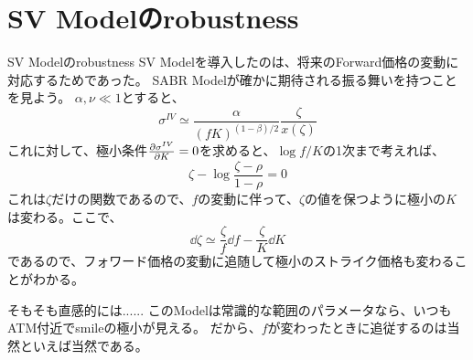 \documentclass[dvipdfmx,9pt]{beamer}
\begin{document}
\section{SV Modelのrobustness}
\begin{frame}{SV Modelのrobustness}
  SV Modelを導入したのは、将来のForward価格の変動に対応するためであった。
  SABR Modelが確かに期待される振る舞いを持つことを見よう。
  $\alpha,\nu \ll 1$とすると、
  \begin{equation}
    \sigma^{IV} \simeq \frac{\alpha}{(fK)^{(1-\beta)/2}}\frac{\zeta}{x(\zeta)}
  \end{equation}
  これに対して、極小条件$\pdv{\sigma^{IV}}{K} = 0$を求めると、$\log f/K$の1次まで考えれば、
  \begin{equation}
    \zeta - \log \frac{\zeta - \rho}{1 - \rho} = 0
  \end{equation}
  これは$\zeta$だけの関数であるので、$f$の変動に伴って、$\zeta$の値を保つように極小の$K$は変わる。ここで、
  \begin{equation}
    \dd \zeta \simeq \frac{\zeta}{f} \dd f - \frac{\zeta}{K} \dd K
  \end{equation}
  であるので、フォワード価格の変動に追随して極小のストライク価格も変わることがわかる。
  \begin{alertblock}{そもそも直感的には......}
    このModelは常識的な範囲のパラメータなら、いつもATM付近でsmileの極小が見える。
    だから、$f$が変わったときに追従するのは当然といえば当然である。
  \end{alertblock}
\end{frame}
\end{document}
